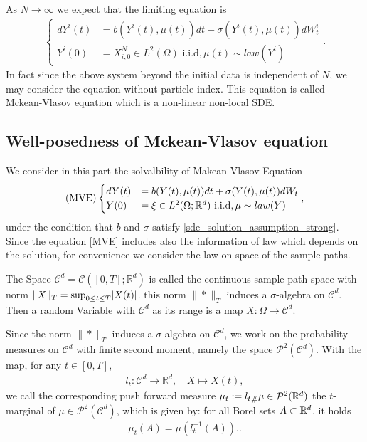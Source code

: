  As $N \to \infty$ we expect that the limiting equation is
  \begin{align*}
    \begin{cases}
      dY^{i}(t) &= b(Y^{i}(t) ,\mu(t) ) dt + \sigma(Y^{i}(t),\mu(t) )dW_t^i \\
      Y^{i}(0)  &=  X_{i,0}^{N} \in  L^2(\Omega ) \text{ i.i.d}, \mu(t)\sim law (Y^i)
    \end{cases}
  .\end{align*}
 In fact since the above system beyond the initial data is independent of $N$, we may consider the equation without particle index.
 This equation is called Mckean-Vlasov equation which is a non-linear non-local SDE.
\subsection{Well-posedness of Mckean-Vlasov equation}
 We consider in this part the solvalbility of Makean-Vlasov Equation 
\begin{align}\label{MVE}
    \text{(MVE)} \begin{cases}
      dY(t) &= b(Y(t) ,\mu(t) ) dt + \sigma(Y(t),\mu(t) )dW_t \\
      Y(0)  &=  \xi \in  L^2(\Omega;\mathbb{R}^d ) \text{ i.i.d}, \mu\sim law (Y) 
    \end{cases}
,\end{align}  
under the condition that $b$ and $\sigma$ satisfy \autoref{sde_solution_assumption_strong}. Since the equation \autoref{MVE} includes also the information of law which depends on the solution, for convenience we consider the law on space of the sample paths.
\begin{definition}
 The Space  $\mathcal{C}^{d} = \mathcal{C}([0,T];\mathbb{R}^{d} ) $ is called the continuous sample path space with norm 
$  \|X\|_T = \sup_{0\le t \le T} \lvert X(t)\rvert$. 
 this norm $\|*\|_T$ induces a $\sigma$-algebra on $\mathcal{C}^{d} $.
Then a random Variable with $\mathcal{C}^{d} $ as its range is a map $ X : \Omega \to \mathcal{C}^{d} $.
\end{definition}
\begin{definition}
 Since the norm $\|*\|_T$  induces a $\sigma$-algebra on $\mathcal{C}^{d} $, we work on the probability measures on $\mathcal{C}^{d}$ with finite second moment, namely the space $\mathcal{P}^2(\mathcal{C}^{d} )$. With the map, for any $t\in[0,T]$, 
 \begin{align*}
  l_t : \mathcal{C}^{d} \to  \mathbb{R}^{d}, \quad X \mapsto X(t)  
 ,\end{align*}
 we call the corresponding push forward measure $\mu_t:={l_t}_\#\mu\in \mathcal{P}^2(\mathbb{R}^d)$ the $t$-marginal of $\mu\in \mathcal{P}^2(\mathcal{C}^{d} )$, which is given by: for all Borel sets $A\subset\mathbb{R}^d$, it holds
 \begin{align*}
  \mu_t (A)= \mu(l^{-1}_t(A) ).
 .\end{align*}
\end{definition}

